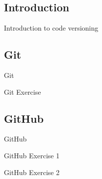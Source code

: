 \documentclass{beamer}
\begin{document}
\frame{\titlepage}

\subsection{Introduction}
\begin{frame}{}
    \huge{Introduction to code versioning}
\end{frame}


\subsection{Git}
\begin{frame}{}
    \huge{Git}
\end{frame}

\begin{frame}{}
    \huge{Git Exercise}
\end{frame}



\subsection{GitHub}
\begin{frame}{}
    \huge{GitHub}
\end{frame}


\begin{frame}{}
    \huge{GitHub Exercise 1}
\end{frame}


\begin{frame}{}
    \huge{GitHub Exercise 2}
\end{frame}





\end{document}
